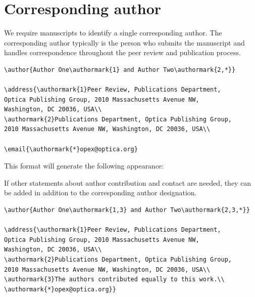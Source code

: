 \documentclass{optica-article}
\begin{document}
\section{Corresponding author}

We require manuscripts to identify a single corresponding author. The corresponding author typically is the person who submits the manuscript and handles correspondence throughout the peer review and publication process. 

\begin{verbatim}
\author{Author One\authormark{1} and Author Two\authormark{2,*}}

\address{\authormark{1}Peer Review, Publications Department,
Optica Publishing Group, 2010 Massachusetts Avenue NW,
Washington, DC 20036, USA\\
\authormark{2}Publications Department, Optica Publishing Group,
2010 Massachusetts Avenue NW, Washington, DC 20036, USA\\

\email{\authormark{*}opex@optica.org}
\end{verbatim}

This format will generate the following appearance:  

\bigskip

\author{Author One and Author Two}

\address{Peer Review, Publications Department,
Optica Publishing Group, 2010 Massachusetts Avenue NW,
Washington, DC 20036, USA\\
Publications Department, Optica Publishing Group,
2010 Massachusetts Avenue NW, Washington, DC 20036, USA\\

}

\medskip

If other statements about author contribution and contact are needed, they can be added in addition to the corresponding author designation.
\begin{verbatim}
\author{Author One\authormark{1,3} and Author Two\authormark{2,3,*}}

\address{\authormark{1}Peer Review, Publications Department,
Optica Publishing Group, 2010 Massachusetts Avenue NW,
Washington, DC 20036, USA\\
\authormark{2}Publications Department, Optica Publishing Group,
2010 Massachusetts Avenue NW, Washington, DC 20036, USA\\
\authormark{3}The authors contributed equally to this work.\\
\authormark{*}opex@optica.org}}
\end{verbatim}
\end{document}
